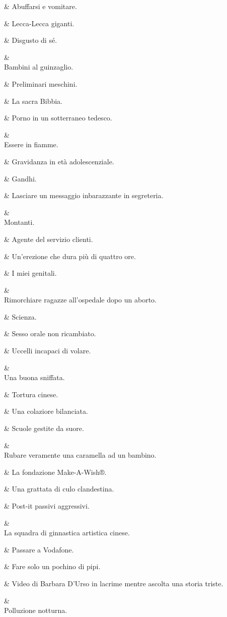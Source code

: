 &
Abuffarsi e
vomitare.

&
Lecca-Lecca
giganti.

&
Disgusto di sé.

&
\\
Bambini al
guinzaglio.

&
Preliminari
meschini.

&
La sacra Bibbia.

&
Porno in un
sotterraneo
tedesco.

&
\\
Essere in
fiamme.

&
Gravidanza in età
adolescenziale.

&
Gandhi.

&
Lasciare un
messaggio
inbarazzante in
segreteria.

&
\\
Montanti.

&
Agente del
servizio clienti.

&
Un’erezione
che dura più di
quattro ore.

&
I miei genitali.

&
\\
Rimorchiare
ragazze
all’ospedale
dopo un aborto.

&
Scienza.

&
Sesso orale non
ricambiato.

&
Uccelli incapaci
di volare.

&
\\
Una buona
sniffata.

&
Tortura cinese.

&
Una colaziore
bilanciata.

&
Scuole gestite da
suore.

&
\\
Rubare
veramente una
caramella ad un
bambino.

&
La fondazione
Make-A-Wish®.

&
Una grattata di
culo clandestina.

&
Post-it passivi
aggressivi.

&
\\
La squadra
di ginnastica
artistica cinese.

&
Passare a
Vodafone.

&
Fare solo un
pochino di pipi.

&
Video di Barbara
D’Urso in lacrime
mentre ascolta
una storia triste.

&
\\
Polluzione
notturna.

